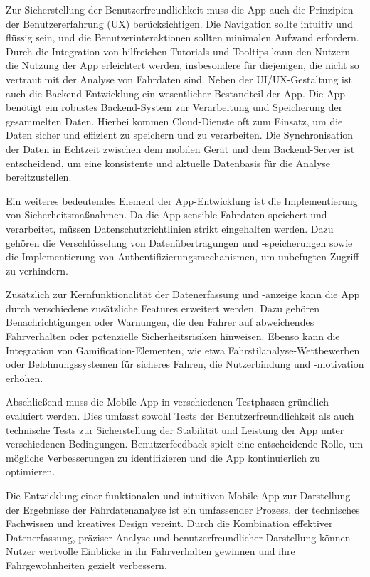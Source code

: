 \documentclass[oneside]{ausarbeitung}
\begin{document}
\begin{itemize}
  Zur Sicherstellung der Benutzerfreundlichkeit muss die App auch die Prinzipien der Benutzererfahrung (UX) berücksichtigen. 
  Die Navigation sollte intuitiv und flüssig sein, und die Benutzerinteraktionen sollten minimalen Aufwand erfordern. Durch die Integration
  von hilfreichen Tutorials und Tooltips kann den Nutzern die Nutzung der App erleichtert werden, insbesondere für diejenigen, die nicht 
  so vertraut mit der Analyse von Fahrdaten sind.
  Neben der UI/UX-Gestaltung ist auch die Backend-Entwicklung ein wesentlicher Bestandteil der App. Die App benötigt ein robustes 
  Backend-System zur Verarbeitung und Speicherung der gesammelten Daten. Hierbei kommen Cloud-Dienste oft zum Einsatz, um die Daten sicher
  und effizient zu speichern und zu verarbeiten. Die Synchronisation der Daten in Echtzeit zwischen dem mobilen Gerät und dem Backend-Server 
  ist entscheidend, um eine konsistente und aktuelle Datenbasis für die Analyse bereitzustellen.
  
  Ein weiteres bedeutendes Element der App-Entwicklung ist die Implementierung von Sicherheitsmaßnahmen. Da die App sensible Fahrdaten 
  speichert und verarbeitet, müssen Datenschutzrichtlinien strikt eingehalten werden. Dazu gehören die Verschlüsselung von 
  Datenübertragungen und -speicherungen sowie die Implementierung von Authentifizierungsmechanismen, um unbefugten Zugriff zu verhindern.
  
  Zusätzlich zur Kernfunktionalität der Datenerfassung und -anzeige kann die App durch verschiedene zusätzliche Features erweitert 
  werden. Dazu gehören Benachrichtigungen oder Warnungen, die den Fahrer auf abweichendes Fahrverhalten oder potenzielle Sicherheitsrisiken
   hinweisen. Ebenso kann die Integration von Gamification-Elementen, wie etwa Fahrstilanalyse-Wettbewerben oder Belohnungssystemen für 
   sicheres Fahren, die Nutzerbindung und -motivation erhöhen.
  
  Abschließend muss die Mobile-App in verschiedenen Testphasen gründlich evaluiert werden. Dies umfasst sowohl Tests der 
  Benutzerfreundlichkeit als auch technische Tests zur Sicherstellung der Stabilität und Leistung der App unter verschiedenen Bedingungen. 
  Benutzerfeedback spielt eine entscheidende Rolle, um mögliche Verbesserungen zu identifizieren und die App kontinuierlich zu optimieren.
  
  Die Entwicklung einer funktionalen und intuitiven Mobile-App zur Darstellung der Ergebnisse der Fahrdatenanalyse ist ein umfassender 
  Prozess, der technisches Fachwissen und kreatives Design vereint. Durch die Kombination effektiver Datenerfassung, präziser Analyse 
  und benutzerfreundlicher Darstellung können Nutzer wertvolle Einblicke in ihr Fahrverhalten gewinnen und ihre Fahrgewohnheiten gezielt 
  verbessern.
\end{itemize}
\end{document}

